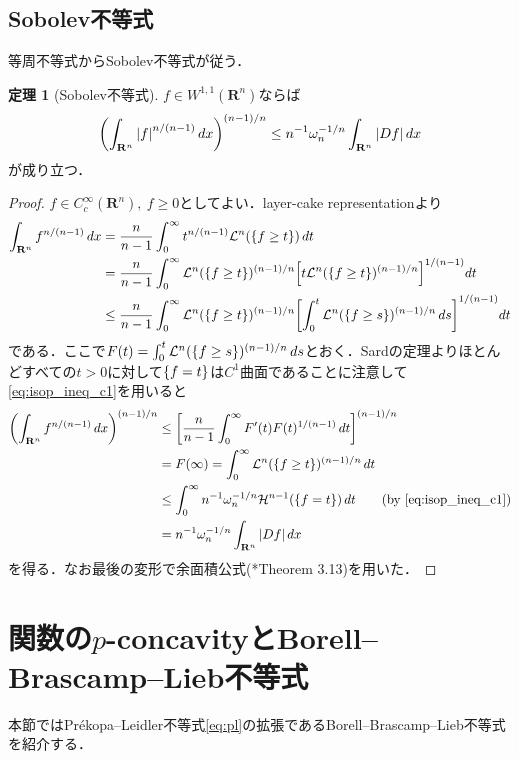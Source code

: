 \documentclass[a4j]{ltjsarticle}
\newcommand{\Rset}{\mathbf{R}}
\newcommand{\Lm}{\mathcal{L}}
\newcommand{\Hm}{\mathcal{H}}
\newcommand{\1}{\bm{1}}
\numberwithin{equation}{section}
\theoremstyle{definition}
\newtheorem{thm}{定理}[section]
\begin{document}
\subsection{Sobolev不等式}
等周不等式からSobolev不等式が従う．
\begin{thm}[Sobolev不等式]
    $f\in W^{1,1}(\Rset^n)$ならば
    \begin{equation}
        \qty(\int_{\Rset^n}\abs{f}^{n/(n-1)}\,dx)^{(n-1)/n}\leq n^{-1}\omega_n^{-1/n}\int_{\Rset^n}\abs{Df}\,dx
    \end{equation}
    が成り立つ．
\end{thm}
\begin{proof}
    $f\in C^\infty_c(\Rset^n),\ f\geq0$としてよい．layer-cake representationより
    \begin{align}
        \int_{\Rset^n}f^{n/(n-1)}\,dx&=\frac{n}{n-1}\int_{0}^{\infty}t^{n/(n-1)}\Lm^n(\qty{f\geq t})\,dt\\
        &=\frac{n}{n-1}\int_{0}^{\infty}\Lm^n(\qty{f\geq t})^{(n-1)/n}\qty[t\Lm^n(\qty{f\geq t})^{(n-1)/n}]^{1/(n-1)}dt\\
        &\leq \frac{n}{n-1}\int_{0}^{\infty}\Lm^n(\qty{f\geq t})^{(n-1)/n}\qty[\int_{0}^{t}\Lm^n(\qty{f\geq s})^{(n-1)/n}\,ds]^{1/(n-1)}dt
    \end{align}
    である．ここで$F(t)=\int_{0}^{t}\Lm^n(\qty{f\geq s})^{(n-1)/n}\,ds$とおく．Sardの定理よりほとんどすべての$t>0$に対して$\qty{f=t}$は$C^1$曲面であることに注意して\eqref{eq:isop_ineq_c1}を用いると
    \begin{align}
        \qty(\int_{\Rset^n}f^{n/(n-1)}\,dx)^{(n-1)/n}&\leq \qty[\frac{n}{n-1}\int_{0}^{\infty}F'(t)F(t)^{1/(n-1)}\,dt]^{(n-1)/n}\\
        &=F(\infty)=\int_{0}^{\infty}\Lm^n(\qty{f\geq t})^{(n-1)/n}\,dt\\
        &\leq \int_{0}^{\infty}n^{-1}\omega_n^{-1/n}\Hm^{n-1}(\qty{f=t})\,dt\quad\quad (\text{by \eqref{eq:isop_ineq_c1}})\\
        &=n^{-1}\omega_n^{-1/n}\int_{\Rset^n}\abs{Df}\,dx 
    \end{align}
    を得る．なお最後の変形で余面積公式(\cite{EG}*{Theorem 3.13})を用いた．
\end{proof}

\section{関数の\texorpdfstring{$p$}{TEXT}-concavityとBorell--Brascamp--Lieb不等式}
本節ではPr\'ekopa--Leidler不等式\eqref{eq:pl}の拡張であるBorell--Brascamp--Lieb不等式を紹介する．
\end{document}
